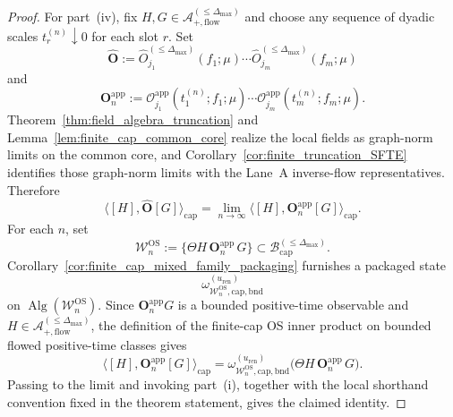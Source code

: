 \begin{proof}
For part~(iv), fix $H,G\in\mathcal A_{+,\mathrm{flow}}^{(\le \Delta_{\max})}$ and choose any sequence of dyadic scales
$t_r^{(n)}\downarrow 0$ for each slot $r$.
Set
\[
\widehat{\mathbf O}
:=
\widehat O_{j_1}^{(\le \Delta_{\max})}(f_1;\mu)\cdots
\widehat O_{j_m}^{(\le \Delta_{\max})}(f_m;\mu)
\]
and
\[
\mathbf O_n^{\mathrm{app}}
:=
\mathcal O_{j_1}^{\mathrm{app}}(t_1^{(n)};f_1;\mu)\cdots
\mathcal O_{j_m}^{\mathrm{app}}(t_m^{(n)};f_m;\mu).
\]
Theorem~\ref{thm:field_algebra_truncation} and Lemma~\ref{lem:finite_cap_common_core} realize the local fields as graph-norm limits on the common core, and
Corollary~\ref{cor:finite_truncation_SFTE} identifies those graph-norm limits with the Lane~A inverse-flow representatives.
Therefore
\[
\big\langle [H],\widehat{\mathbf O}[G]\big\rangle_{\mathrm{cap}}
=
\lim_{n\to\infty}\big\langle [H],\mathbf O_n^{\mathrm{app}}[G]\big\rangle_{\mathrm{cap}}.
\]
For each $n$, set
\[
\mathcal W_n^{\mathrm{OS}}:=\{\Theta H\,\mathbf O_n^{\mathrm{app}}\,G\}\subset \mathcal B_{\mathrm{cap}}^{(\le \Delta_{\max})}.
\]
Corollary~\ref{cor:finite_cap_mixed_family_packaging} furnishes a packaged state
\[
\omega_{\mathcal W_n^{\mathrm{OS}},\mathrm{cap,bnd}}^{(u_{\mathrm{ren}})}
\]
on $\operatorname{Alg}(\mathcal W_n^{\mathrm{OS}})$.
Since $\mathbf O_n^{\mathrm{app}}G$ is a bounded positive-time observable and $H\in\mathcal A_{+,\mathrm{flow}}^{(\le \Delta_{\max})}$, the definition of the finite-cap OS inner product on bounded flowed positive-time classes gives
\[
\big\langle [H],\mathbf O_n^{\mathrm{app}}[G]\big\rangle_{\mathrm{cap}}
=
\omega_{\mathcal W_n^{\mathrm{OS}},\mathrm{cap,bnd}}^{(u_{\mathrm{ren}})}\bigl(\Theta H\,\mathbf O_n^{\mathrm{app}}\,G\bigr).
\]
Passing to the limit and invoking part~(i), together with the local shorthand convention fixed in the theorem statement, gives the claimed identity.
\end{proof}

\begin{center}
\end{center}

